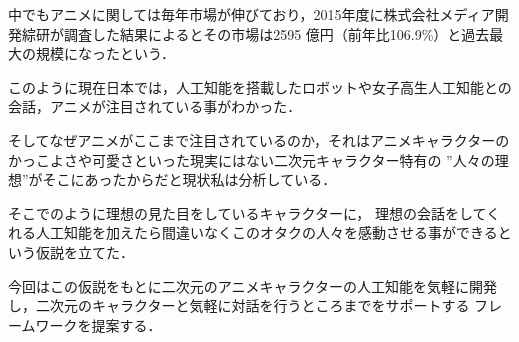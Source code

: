 中でもアニメに関しては毎年市場が伸びており，2015年度に株式会社メディア開発綜研が調査した結果によるとその市場は2595
億円（前年比106.9\%）と過去最大の規模になったという．\cite{anime}

このように現在日本では，人工知能を搭載したロボットや女子高生人工知能との会話，アニメが注目されている事がわかった．

そしてなぜアニメがここまで注目されているのか，それはアニメキャラクターのかっこよさや可愛さといった現実にはない二次元キャラクター特有の
”人々の理想”がそこにあったからだと現状私は分析している．


そこでのように理想の見た目をしているキャラクターに，
理想の会話をしてくれる人工知能を加えたら間違いなくこのオタクの人々を感動させる事ができるという仮説を立てた．

今回はこの仮説をもとに二次元のアニメキャラクターの人工知能を気軽に開発し，二次元のキャラクターと気軽に対話を行うところまでをサポートする
フレームワークを提案する．

